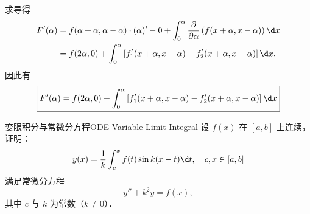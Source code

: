 \begin{solution}

    求导得
    \begin{equation}
        \begin{aligned}
            F'(\alpha) & = f(\alpha+\alpha, \alpha-\alpha) \cdot (\alpha)' - 0 + \int_{0}^{\alpha} \frac{\partial}{\partial \alpha} \left( f(x+\alpha, x-\alpha) \right) \d x \\
                       & = f(2\alpha, 0) + \int_{0}^{\alpha} \left[ f'_1(x+\alpha, x-\alpha) - f'_2(x+\alpha, x-\alpha) \right] \d x.
        \end{aligned}
    \end{equation}
    因此有
    \begin{equation}
        \boxed{F'(\alpha) = f(2\alpha, 0) + \int_{0}^{\alpha} \left[ f'_1(x+\alpha, x-\alpha) - f'_2(x+\alpha, x-\alpha) \right] \d x}
    \end{equation}
\end{solution}

\begin{problem}{变限积分与常微分方程}{ODE-Variable-Limit-Integral}
    设 $f(x)$ 在 $[a, b]$ 上连续，证明：
    \begin{equation}
        y(x) = \frac{1}{k} \int_{c}^{x} f(t) \sin k(x - t) \d t, \quad c, x \in [a, b]
    \end{equation}
    满足常微分方程
    \begin{equation}
        y'' + k^2 y = f(x),
    \end{equation}
    其中 $c$ 与 $k$ 为常数（$k \neq 0$）．
\end{problem}

